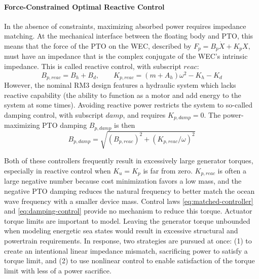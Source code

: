 \paragraph{Force-Constrained Optimal Reactive Control}
In the absence of constraints, maximizing absorbed power requires impedance matching.
At the mechanical interface between the floating body and PTO, this means that the force of the PTO on the WEC, described by $F_{p} = B_{p}\dot{X} + K_{p}X$, must have an impedance that is the complex conjugate of the WEC's intrinsic impedance.
This is called reactive control, with subscript $reac$:
\begin{equation}\label{eq:matched-controller}
	B_{p,reac} = B_h + B_d, \qquad K_{p,reac} = (m+A_h) \omega^2 - K_h - K_d
\end{equation}
However, the nominal RM3 design features a hydraulic system which lacks reactive capability (the ability to function as a motor and add energy to the system at some times).
Avoiding reactive power restricts the system to so-called damping control, with subscript $damp$, and requires $K_{p,damp}=0$.
The power-maximizing PTO damping $B_{p,damp}$ is then
\begin{equation}\label{eq:damping-control}
    B_{p,damp} = \sqrt{ (B_{p,reac})^2 + (K_{p,reac}/\omega)^2}
\end{equation}

Both of these controllers frequently result in excessively large generator torques, especially in reactive control when $K_u=K_p$ is far from zero. $K_{p,reac}$ is often a large negative number because cost minimization favors a low mass, and the negative PTO damping reduces the natural frequency to better match the ocean wave frequency with a smaller device mass.
Control laws \eqref{eq:matched-controller} and \eqref{eq:damping-control} provide no mechanism to reduce this torque.
Actuator torque limits are important to model.
Leaving the generator torque unbounded when modeling energetic sea states would result in excessive structural and powertrain requirements.
In response, two strategies are pursued at once: (1) to create an intentional linear impedance mismatch, sacrificing power to satisfy a torque limit, and (2) to use nonlinear control to enable satisfaction of the torque limit with less of a power sacrifice.

